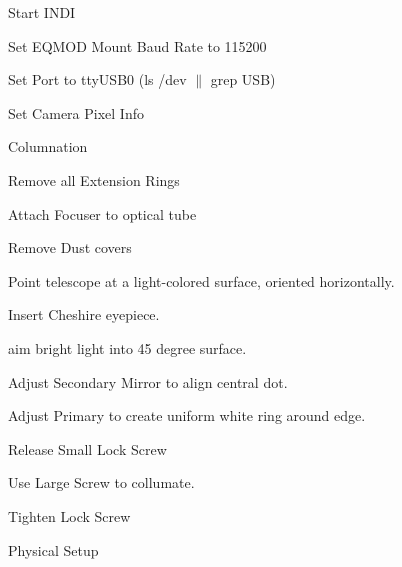 \documentclass{article}
\begin{document}
\begin{itemize}
\begin{todolist}
\begin{todolist}
				\end{todolist}
			\item Start INDI
			
			\item Set EQMOD Mount Baud Rate to 115200
			
			\item Set Port to ttyUSB0 (ls /dev $\|$ grep USB)
			\item Set Camera Pixel Info
			

				
			
			
			
			
			
			
		\end{todolist}
		
		\item Columnation
		\begin{todolist}
			\item Remove all Extension Rings
			\item Attach Focuser to optical tube
			\item Remove Dust covers
			\item Point telescope at a light-colored surface, oriented horizontally.
			\item Insert Cheshire eyepiece.
			\item aim bright light into 45 degree surface.
			\item Adjust Secondary Mirror to align central dot.
			\item Adjust Primary to create uniform white ring around edge.
				\begin{todolist}
					\item Release Small Lock Screw
					\item Use Large Screw to collumate.
					\item Tighten Lock Screw
				\end{todolist}
								
			
			
			
			\end{todolist}
		
		
		
		
		\item Physical Setup
		

\end{itemize}
\end{document}
